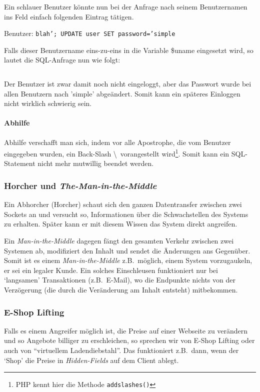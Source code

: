 \inputminted[firstline=1,lastline=4]{php}{query.php}

Ein schlauer Benutzer könnte nun bei der Anfrage nach seinem Benutzernamen
ins Feld einfach folgenden Eintrag tätigen.

Benutzer: \texttt{blah'; UPDATE user SET password='simple}

Falls dieser Benutzername eins-zu-eins in die Variable \$uname eingesetzt
wird, so lautet die SQL-Anfrage nun wie folgt:

\inputminted[firstline=6,lastline=10]{php}{query.php}

Der Benutzer ist zwar damit noch nicht eingeloggt, aber das Passwort wurde
bei allen Benutzern nach 'simple' abgeändert. Somit kann ein späteres
Einloggen nicht wirklich schwierig sein.

\paragraph*{Abhilfe} Abhilfe verschafft man sich, indem vor alle Apostrophe,
die vom Benutzer eingegeben wurden, ein Back-Slash \textbackslash~vorangestellt
wird\footnote{PHP kennt hier die Methode \texttt{addslashes()}}.
Somit kann ein SQL-Statement nicht mehr mutwillig beendet werden.

\subsubsection*{Horcher und \emph{The-Man-in-the-Middle}}

Ein Abhorcher (Horcher) schaut sich den ganzen Datentransfer zwischen zwei
Sockets an und versucht so, Informationen über die Schwachstellen des
Systems zu erhalten. Später kann er mit diesem Wissen das System direkt angreifen.

Ein \emph{Man-in-the-Middle} dagegen fängt den gesamten Verkehr zwischen zwei
Systemen ab, modifiziert den Inhalt und sendet die Änderungen ans Gegenüber.
Somit ist es einem \emph{Man-in-the-Middle} z.B.~möglich, einem System vorzugaukeln,
er sei ein legaler Kunde. Ein solches Einschleusen funktioniert nur bei `langsamen'
Transaktionen (z.B.~E-Mail), wo die Endpunkte nichts von der Verzögerung
(die durch die Veränderung am Inhalt entsteht) mitbekommen.

\subsubsection*{E-Shop Lifting}

Falls es einem Angreifer möglich ist, die Preise auf einer Webseite zu verändern
und so Angebote billiger zu erschleichen, so sprechen wir von E-Shop Lifting oder
auch von ``virtuellem Ladendiebstahl''\cite{ct:26:2002}. Das funktioniert z.B.~dann,
wenn der `Shop' die Preise in \emph{Hidden-Fields} auf dem Client ablegt.

